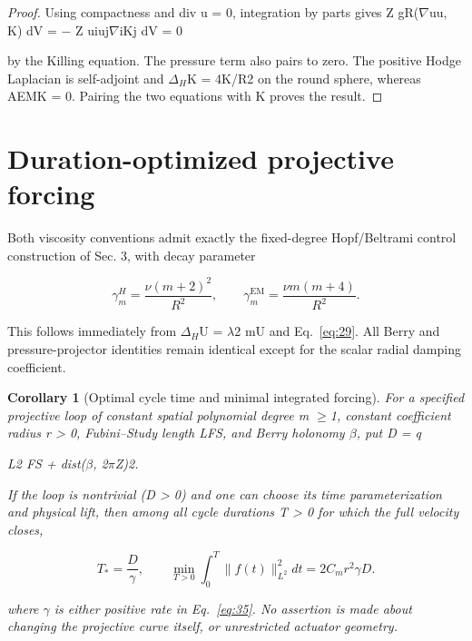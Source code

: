 \documentclass[10pt,letterpaper]{article}
\newtheorem{corollary}[theorem]{Corollary}
\theoremstyle{remark}
\begin{document}
\begin{proof}
Using compactness and div u = 0, integration by parts gives Z gR(\(\nabla \)uu, K) dV = \(- \) Z uiuj\(\nabla \)iKj dV = 0

by the Killing equation. The pressure term also pairs to zero. The positive Hodge Laplacian is self-adjoint and \(\Delta_H\)K = 4K/R2 on the round sphere, whereas AEMK = 0. Pairing the two equations with K proves the result.


\end{proof}

\section{Duration-optimized projective forcing}

Both viscosity conventions admit exactly the fixed-degree Hopf/Beltrami control construction of Sec. 3, with decay parameter



\begin{equation}
\tag{35}\label{eq:35}
\gamma_m^H=\frac{\nu(m+2)^2}{R^2},\qquad\gamma_m^{\mathrm{EM}}=\frac{\nu m(m+4)}{R^2}.
\end{equation}

This follows immediately from \(\Delta_H\)U = \(\lambda \)2 mU and Eq.~\eqref{eq:29}. All Berry and pressure-projector identities remain identical except for the scalar radial damping coefficient.


\begin{corollary}[Optimal cycle time and minimal integrated forcing]

For a specified projective loop of constant spatial polynomial degree m \(\ge \)1, constant coefficient radius r > 0, Fubini–Study length LFS, and Berry holonomy \(\beta \), put D = q

L2 FS + dist(\(\beta \), 2\(\pi \)Z)2.


If the loop is nontrivial (D > 0) and one can choose its time parameterization and physical lift, then among all cycle durations T > 0 for which the full velocity closes,



\begin{equation}
\tag{36}\label{eq:36}
T_* =\frac{D}{\gamma},\qquad \min_{T>0}\int_0^T\|f(t)\|_{L^2}^2dt=2C_mr^2\gamma D.
\end{equation}

where \(\gamma \) is either positive rate in Eq.~\eqref{eq:35}. No assertion is made about changing the projective curve itself, or unrestricted actuator geometry.


\end{corollary}
\end{document}
